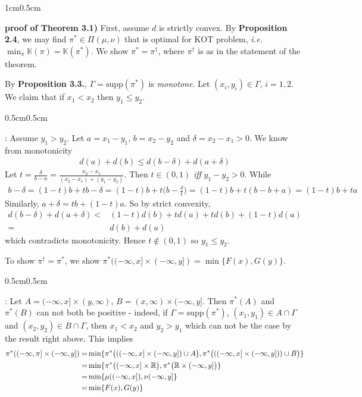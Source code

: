 \documentclass[12pt,a4paper]{article}
\newenvironment{proof}
{\begin{changemargin}{1cm}{0.5cm} 
	}%
	{\end{changemargin}
}
\newenvironment{subproof}
{\begin{changemargin}{0.5cm}{0.5cm} 
	}%
	{\end{changemargin}
}
\newenvironment{p}
{\begin{proof} 
	}%
	{\end{proof}
}
\begin{document}
\begin{p}
\textbf{proof of Theorem 3.1)} First, assume $d$ is strictly convex. By \textbf{Proposition 2.4}, we may find $\pi^* \in \Pi(\mu, \nu)$ that is optimal for KOT problem, \textit{i.e.}  $\min_{\pi} \mathbb{K}(\pi) = \mathbb{K}(\pi^{*})$. We show $\pi^* =\pi^{\dagger}$, where $\pi^{\dagger}$ is as in the statement of the theorem.

\quad By \textbf{Proposition 3.3.}, $\Gamma = \text{supp}(\pi^*)$ is \emph{monotone}. Let $(x_i,y_i) \in \Gamma$, $i=1,2$. We claim that if $x_1<x_2$ then $y_1\leq y_2$.
\begin{subproof}
: Assume $y_1 >y_2$. Let $a= x_1 -y_1$, $b=x_2-y_2$ and $\delta = x_2 -x_1>0$. We know from monotonicity
\begin{align*}
d(a) + d(b) \leq d(b-\delta) + d(a+ \delta)
\end{align*}
Let $t =\frac{\delta}{b-a} = \frac{x_2 -x_1}{(x_2-x_1)+(y_1-y_2)}$. Then $t\in (0,1)$ \emph{iff} $y_1-y_2 >0$. While
\begin{align*}
b-\delta = (1-t)b + tb -\delta =(1-t)b +t \Big(b- \frac{\delta}{t}\Big) = (1-t)b + t(b-b+a) = (1-t)b +ta
\end{align*} 
Similarly, $a+ \delta = tb + (1-t)a$. So by strict convexity,
\begin{align*}
d(b-\delta) + d(a+ \delta) <& (1-t) d(b) + td(a) + td(b) + (1-t)d(a) \\
=& d(b) + d(a)
\end{align*}
which contradicts monotonicity. Hence $t\not \in(0,1)$ so $y_1 \leq y_2$.
\end{subproof}
To show $\pi^{\dagger} = \pi^*$, we show $\pi^*( (-\infty, x] \times (-\infty, y] ) = \min \{ F(x), G(y)\}$.
\begin{subproof}
: Let $A= (-\infty, x] \times (y, \infty)$, $B= (x, \infty) \times (-\infty, y]$. Then $\pi^*(A)$ and $\pi^*(B)$ can not both be positive - indeed, if $\Gamma =\text{supp}(\pi^*)$, $(x_1,y_1)\in A\cap \Gamma$ and $(x_2, y_2) \in B\cap \Gamma$, then $x_1 <x_2$ and $y_2 >y_1$ which can not be the case by the result right above. This implies
\begin{align*}
\pi^*((-\infty, \pi ] \times (-\infty, y]) =& \min \{ \pi^* \big(( (-\infty, x] \times (-\infty, y]) \cup A \big), \pi^* \big(((-\infty, x] \times (-\infty, y]))\cup B \big) \} \\
= &\min \{ \pi^* \big((-\infty, x] \times \mathbb{R} \big), \pi^* \big(\mathbb{R} \times (-\infty,y] \big)\} \\
=&\min \{\mu((-\infty, x]), \nu(-\infty, y]\} \\
=& \min \{ F(x), G(y) \}
\end{align*}
\end{subproof}
\end{p}
\s
\end{document}
